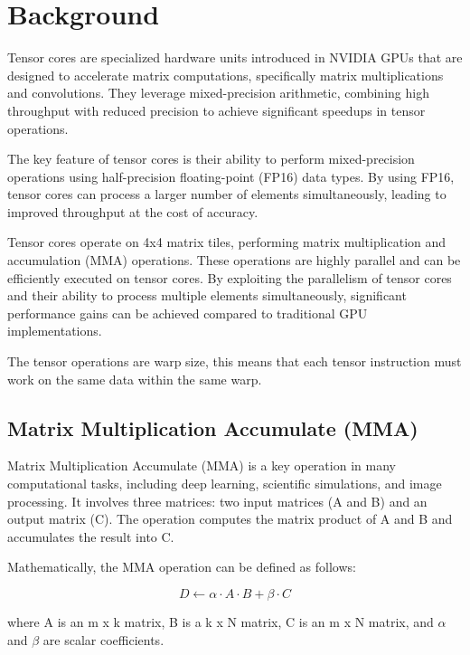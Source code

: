 \documentclass[conference]{IEEEtran}
\begin{document}
  \section{Background}\label{sec:background}
  

  Tensor cores are specialized hardware units introduced in NVIDIA GPUs that are designed to accelerate matrix computations, 
  specifically matrix multiplications and convolutions. They leverage mixed-precision arithmetic, 
  combining high throughput with reduced precision to achieve significant speedups in tensor operations.
  
  The key feature of tensor cores is their ability to perform mixed-precision operations using 
  half-precision floating-point (FP16) data types. By using FP16, tensor cores can process a larger 
  number of elements simultaneously, leading to improved throughput at the cost of accuracy.\cite{precision_FMA} 
  
  Tensor cores operate on 4x4 matrix tiles, performing matrix multiplication and accumulation (MMA) 
  operations. These operations are highly parallel and can be efficiently executed on tensor cores. 
  By exploiting the parallelism of tensor cores and their ability to process multiple elements 
  simultaneously, significant performance gains can be achieved compared to traditional GPU 
  implementations.

  The tensor operations are warp size, this means that each tensor instruction must work on the same 
  data within the same warp.
  
  \subsection{Matrix Multiplication Accumulate (MMA)}\label{sec:mma}
  
  Matrix Multiplication Accumulate (MMA) is a key operation in many computational tasks, including deep 
  learning, scientific simulations, and image processing. It involves three matrices: two input matrices 
  (A and B) and an output matrix (C). The operation computes the matrix product of A and B and accumulates 
  the result into C.
  
  Mathematically, the MMA operation can be defined as follows:
  
  \[ D \leftarrow \alpha \cdot A \cdot B + \beta \cdot C \]
  
  where A is an m x k matrix, B is a k x N matrix, C is an m x N matrix, and $\alpha$ and $\beta$ are scalar coefficients.
  
\end{document}
